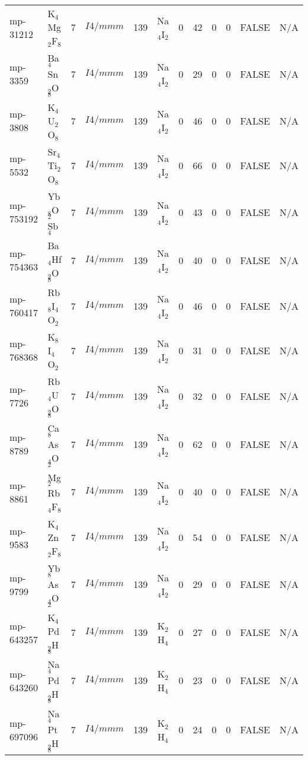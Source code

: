 {\begin{longtable}{llcccccccccc}
    mp-31212 & K$_{4}$Mg$_{2}$F$_{8}$ & 7     & $I4/mmm$ & 139   & Na$_{4}$I$_{2}$ & 0     & 42    & 0     & 0     & FALSE & N/A \\
    mp-3359 & Ba$_{4}$Sn$_{2}$O$_{8}$ & 7     & $I4/mmm$ & 139   & Na$_{4}$I$_{2}$ & 0     & 29    & 0     & 0     & FALSE & N/A \\
    mp-3808 & K$_{4}$U$_{2}$O$_{8}$ & 7     & $I4/mmm$ & 139   & Na$_{4}$I$_{2}$ & 0     & 46    & 0     & 0     & FALSE & N/A \\
    mp-5532 & Sr$_{4}$Ti$_{2}$O$_{8}$ & 7     & $I4/mmm$ & 139   & Na$_{4}$I$_{2}$ & 0     & 66    & 0     & 0     & FALSE & N/A \\
    mp-753192 & Yb$_{8}$O$_{2}$Sb$_{4}$ & 7     & $I4/mmm$ & 139   & Na$_{4}$I$_{2}$ & 0     & 43    & 0     & 0     & FALSE & N/A \\
    mp-754363 & Ba$_{4}$Hf$_{2}$O$_{8}$ & 7     & $I4/mmm$ & 139   & Na$_{4}$I$_{2}$ & 0     & 40    & 0     & 0     & FALSE & N/A \\
    mp-760417 & Rb$_{8}$I$_{4}$O$_{2}$ & 7     & $I4/mmm$ & 139   & Na$_{4}$I$_{2}$ & 0     & 46    & 0     & 0     & FALSE & N/A \\
    mp-768368 & K$_{8}$I$_{4}$O$_{2}$ & 7     & $I4/mmm$ & 139   & Na$_{4}$I$_{2}$ & 0     & 31    & 0     & 0     & FALSE & N/A \\
    mp-7726 & Rb$_{4}$U$_{2}$O$_{8}$ & 7     & $I4/mmm$ & 139   & Na$_{4}$I$_{2}$ & 0     & 32    & 0     & 0     & FALSE & N/A \\
    mp-8789 & Ca$_{8}$As$_{4}$O$_{2}$ & 7     & $I4/mmm$ & 139   & Na$_{4}$I$_{2}$ & 0     & 62    & 0     & 0     & FALSE & N/A \\
    mp-8861 & Mg$_{2}$Rb$_{4}$F$_{8}$ & 7     & $I4/mmm$ & 139   & Na$_{4}$I$_{2}$ & 0     & 40    & 0     & 0     & FALSE & N/A \\
    mp-9583 & K$_{4}$Zn$_{2}$F$_{8}$ & 7     & $I4/mmm$ & 139   & Na$_{4}$I$_{2}$ & 0     & 54    & 0     & 0     & FALSE & N/A \\
    mp-9799 & Yb$_{8}$As$_{4}$O$_{2}$ & 7     & $I4/mmm$ & 139   & Na$_{4}$I$_{2}$ & 0     & 29    & 0     & 0     & FALSE & N/A \\
    mp-643257 & K$_{4}$Pd$_{2}$H$_{8}$ & 7     & $I4/mmm$ & 139   & K$_{2}$H$_{4}$ & 0     & 27    & 0     & 0     & FALSE & N/A \\
    mp-643260 & Na$_{4}$Pd$_{2}$H$_{8}$ & 7     & $I4/mmm$ & 139   & K$_{2}$H$_{4}$ & 0     & 23    & 0     & 0     & FALSE & N/A \\
    mp-697096 & Na$_{4}$Pt$_{2}$H$_{8}$ & 7     & $I4/mmm$ & 139   & K$_{2}$H$_{4}$ & 0     & 24    & 0     & 0     & FALSE & N/A \\

\end{longtable}}
